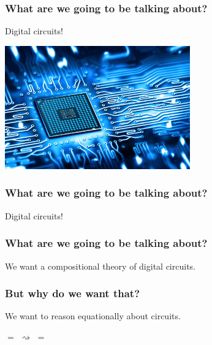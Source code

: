 \begin{frame}
    \frametitle{What are we going to be talking about?}
    \pause
    \centering
    \LARGE
    Digital circuits!

    \includegraphics[width=0.6\textwidth]{imgs/circuit}
\end{frame}
\begin{frame}
    \frametitle{What are we going to be talking about?}
    \centering
    \LARGE
    Digital circuits!

    \vspace{1em}
    \normalsize

\end{frame}
\begin{frame}
    \frametitle{What are we going to be talking about?}

    \pause

    \centering
    \LARGE
    We want a \alert{compositional} theory of digital circuits.

    \vspace{0.5em}

    \normalsize

    \pause
    
    \pause
    \quad
    
    \pause
    \quad
    

    \pause
    \vspace{1em}

    \raisebox{2em}{}
    \quad
    
    \quad
    \raisebox{2em}{}

\end{frame}
\begin{frame}
    \frametitle{But why do we want that?}
    \centering
    \LARGE
    We want to reason \alert{equationally} about circuits.

    \normalsize
    \vspace{2em}

    \pause

    \quad
    \pause
    \(=\)
    \quad
    \quad
    \pause
    \(\rightsquigarrow\)
    \quad
    \quad
    \pause
    \(=\)
    \quad

\end{frame}
